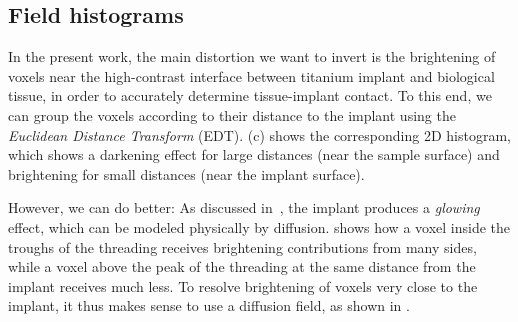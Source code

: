 \subsection{Field histograms}
In the present work, the main distortion we want to invert is the brightening of voxels near the high-contrast interface between
titanium implant and biological tissue, in order to accurately determine tissue-implant contact.
To this end, we can group the voxels according to their distance to the implant using the
{\em Euclidean Distance Transform} (EDT). (c) shows the corresponding 2D histogram, which shows a darkening effect for large distances
(near the sample surface) and brightening for small distances (near the implant surface).

However, we can do better: As discussed in~, the implant produces a \textit{glowing} effect, which
can be modeled physically by diffusion.  shows
how a voxel inside the troughs of the threading receives brightening contributions from many sides, while a voxel above the peak of the threading at
the same distance from the implant receives much less. To resolve brightening of voxels very close to the implant, it thus makes sense
to use a diffusion field, as shown in . 


